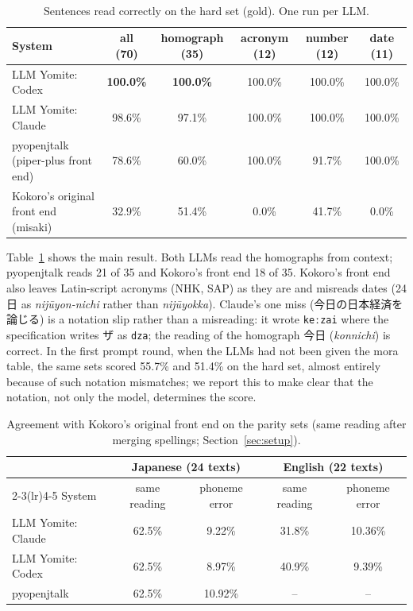 \documentclass[11pt,a4paper]{article}
\newcommand{\ys}[1]{\mbox{\texttt{#1}}}
\newcommand{\provisional}{\textsuperscript{\textdagger}}
\begin{document}
\begin{table}[t]
\centering\small
\caption{Sentences read correctly on the hard set (gold\provisional). One run per LLM.}
\label{tab:hard}
\begin{tabular}{lccccc}
\toprule
System & all (70) & homograph (35) & acronym (12) & number (12) & date (11)\\
\midrule
LLM Yomite: Codex & \textbf{100.0\%} & \textbf{100.0\%} & 100.0\% & 100.0\% & 100.0\%\\
LLM Yomite: Claude & 98.6\% & 97.1\% & 100.0\% & 100.0\% & 100.0\%\\
pyopenjtalk (piper-plus front end) & 78.6\% & 60.0\% & 100.0\% & 91.7\% & 100.0\%\\
Kokoro's original front end (misaki) & 32.9\% & 51.4\% & 0.0\% & 41.7\% & 0.0\%\\
\bottomrule
\end{tabular}
\end{table}

Table~\ref{tab:hard} shows the main result. Both LLMs read the homographs from context; pyopenjtalk reads 21 of 35 and
Kokoro's front end 18 of 35. Kokoro's front end also leaves Latin-script acronyms (NHK, SAP) as they are and misreads
dates (24日 as \emph{nijūyon-nichi} rather than \emph{nijūyokka}). Claude's one miss (今日の日本経済を論じる) is a
notation slip rather than a misreading: it wrote \ys{keːzai} where the specification writes ザ as \ys{dza}; the reading
of the homograph 今日 (\emph{konnichi}) is correct. In the first prompt round, when the LLMs had not been given the mora
table, the same sets scored 55.7\% and 51.4\% on the hard set, almost entirely because of such notation mismatches; we
report this to make clear that the notation, not only the model, determines the score.

\begin{table}[t]
\centering\small
\caption{Agreement with Kokoro's original front end on the parity sets (same reading after merging spellings; Section~\ref{sec:setup}).}
\label{tab:paritysets}
\begin{tabular}{lcccc}
\toprule
& \multicolumn{2}{c}{Japanese (24 texts)} & \multicolumn{2}{c}{English (22 texts)}\\
\cmidrule(lr){2-3}\cmidrule(lr){4-5}
System & same reading & phoneme error & same reading & phoneme error\\
\midrule
LLM Yomite: Claude & 62.5\% & 9.22\% & 31.8\% & 10.36\%\\
LLM Yomite: Codex & 62.5\% & 8.97\% & 40.9\% & 9.39\%\\
pyopenjtalk & 62.5\% & 10.92\% & -- & --\\
\bottomrule
\end{tabular}
\end{table}
\end{document}
